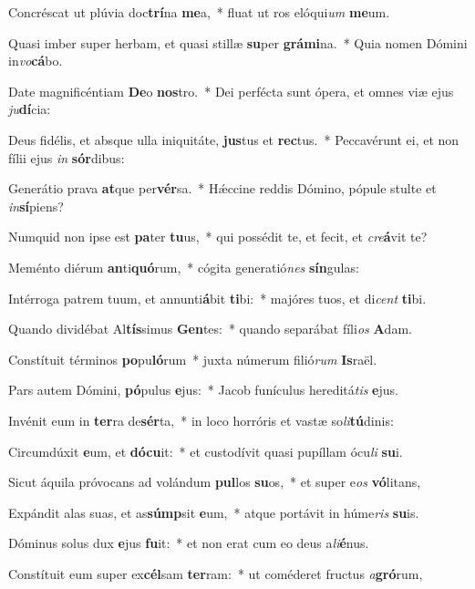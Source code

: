 \item Concréscat ut plúvia doc\textbf{trí}na \textbf{me}a,~* fluat ut ros elóqui\textit{um} \textbf{me}um.
\item Quasi imber super herbam, et quasi stillæ \textbf{su}per \textbf{grá}\textbf{mi}na.~* Quia nomen Dómini in\textit{vo}\textbf{cá}bo.
\item Date magnificéntiam \textbf{De}o \textbf{nos}tro.~* Dei perfécta sunt ópera, et omnes viæ ejus \textit{ju}\textbf{dí}cia:
\item Deus fidélis, et absque ulla iniquitáte, \textbf{jus}tus et \textbf{rec}tus.~* Peccavérunt ei, et non fílii ejus \textit{in} \textbf{sór}dibus:
\item Generátio prava \textbf{at}que per\textbf{vér}sa.~* Hǽccine reddis Dómino, pópule stulte et \textit{in}\textbf{sí}piens?
\item Numquid non ipse est \textbf{pa}ter \textbf{tu}us,~* qui possédit te, et fecit, et \textit{cre}\textbf{á}vit te?
\item Meménto diérum \textbf{an}ti\textbf{quó}rum,~* cógita generatió\textit{nes} \textbf{sín}gulas:
\item Intérroga patrem tuum, et annunti\textbf{á}bit \textbf{ti}bi:~* majóres tuos, et di\textit{cent} \textbf{ti}bi.
\item Quando dividébat Al\textbf{tís}simus \textbf{Gen}tes:~* quando separábat fíli\textit{os} \textbf{A}dam.
\item Constítuit términos \textbf{po}pu\textbf{ló}rum~* juxta númerum filió\textit{rum} \textbf{Is}raël.
\item Pars autem Dómini, \textbf{pó}pulus \textbf{e}jus:~* Jacob funículus hereditá\textit{tis} \textbf{e}jus.
\item Invénit eum in \textbf{ter}ra de\textbf{sér}ta,~* in loco horróris et vastæ so\textit{li}\textbf{tú}dinis:
\item Circumdúxit \textbf{e}um, et \textbf{dó}\textbf{cu}it:~* et custodívit quasi pupíllam ócu\textit{li} \textbf{su}i.
\item Sicut áquila próvocans ad volándum \textbf{pul}los \textbf{su}os,~* et super e\textit{os} \textbf{vó}litans,
\item Expándit alas suas, et as\textbf{súmp}sit \textbf{e}um,~* atque portávit in húme\textit{ris} \textbf{su}is.
\item Dóminus solus dux \textbf{e}jus \textbf{fu}it:~* et non erat cum eo deus a\textit{li}\textbf{é}nus.
\item Constítuit eum super ex\textbf{cél}sam \textbf{ter}ram:~* ut coméderet fructus \textit{a}\textbf{gró}rum,
